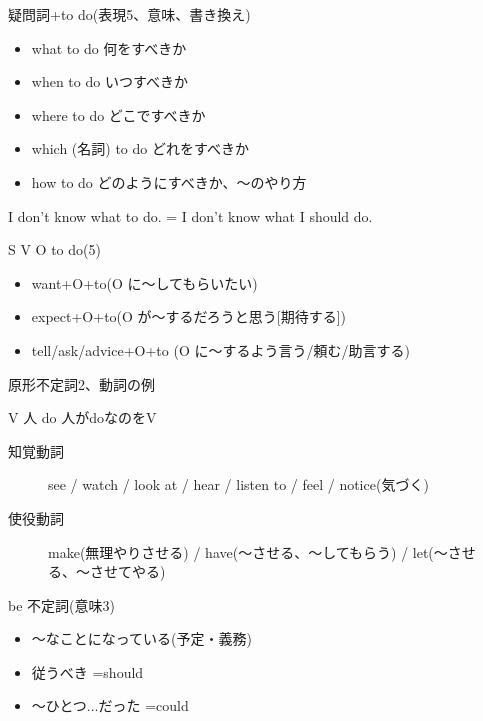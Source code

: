 \documentclass[10pt]{jsarticle}
\newcommand{\answer}[2]{{\color{orange}#2}}
\newcommand{\answer}[2]{\vspace{#1mm}}
\begin{document}
\begin{itembox}[l]{疑問詞+to do(表現5、意味、書き換え)}
	\answer{10}{
		\begin{multicols}{2}
			\begin{itemize}
				\item what to do 何をすべきか
				\item when to do いつすべきか
				\item where to do どこですべきか
				\item which (名詞) to do どれをすべきか
				\item how to do どのようにすべきか、〜のやり方
			\end{itemize}
		\end{multicols}
		I don't know what to do. = I don't know what I should do.
	}
\end{itembox}

\begin{itembox}[l]{S V O to do(5)}
	\answer{10}{
		\begin{itemize}
			\item want+O+to(O に〜してもらいたい)
			\item expect+O+to(O が〜するだろうと思う[期待する])
			\item tell/ask/advice+O+to
			      (O に〜するよう言う/頼む/助言する)
		\end{itemize}
	}
\end{itembox}

\begin{itembox}[l]{原形不定詞2、動詞の例}
	\answer{10}{
		V 人 do 人がdoなのをV
		\begin{description}
			\item[知覚動詞] see / watch / look at / hear / listen to / feel / notice(気づく)
			\item[使役動詞] make(無理やりさせる) / have(〜させる、〜してもらう) / let(〜させる、〜させてやる)
		\end{description}
	}
\end{itembox}
\begin{itembox}[l]{be 不定詞(意味3)}
	\answer{10}{
		\begin{itemize}
			\item 〜なことになっている(予定・義務)
			\item 従うべき =should
			\item 〜ひとつ...だった =could
		\end{itemize}
	}
\end{itembox}
\end{document}
